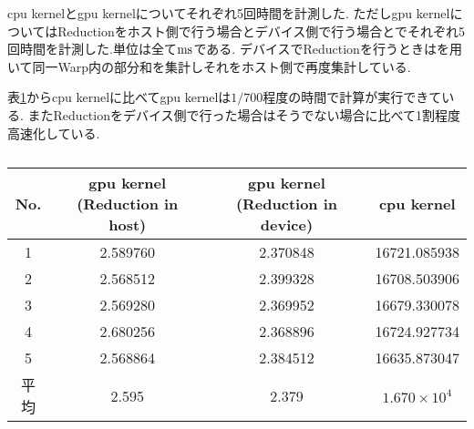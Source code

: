 \documentclass[uplatex,a4j,11pt,dvipdfmx]{jsarticle}
\begin{document}
\title{}
\author{61908697 佐々木良輔}
\date{}
\maketitle
cpu kernelとgpu kernelについてそれぞれ5回時間を計測した.
ただしgpu kernelについてはReductionをホスト側で行う場合とデバイス側で行う場合とでそれぞれ5回時間を計測した.単位は全て${\rm ms}$である.
デバイスでReductionを行うときはを用いて同一Warp内の部分和を集計しそれをホスト側で再度集計している.

表\ref{tab:}からcpu kernelに比べてgpu kernelは$1/700$程度の時間で計算が実行できている.
またReductionをデバイス側で行った場合はそうでない場合に比べて1割程度高速化している.
\begin{table}[h]
\caption{}
\label{tab:}
\centering
\begin{tabular}{cccc}
\hline
No.&gpu kernel (Reduction in host)&gpu kernel (Reduction in device)&cpu kernel\\
\hline \hline
1&2.589760&2.370848&16721.085938\\
2&2.568512&2.399328&16708.503906\\
3&2.569280&2.369952&16679.330078\\
4&2.680256&2.368896&16724.927734\\
5&2.568864&2.384512&16635.873047\\
\hline
平均&2.595&2.379&$1.670\times10^4$\\
\hline
\end{tabular}
\end{table}
\end{document}
